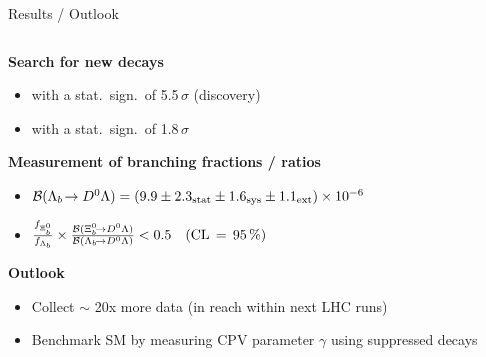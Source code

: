 \begin{frame}{Results / Outlook}
    \begin{columns}
        \begin{column}{.7\textwidth}
            \textbf{Search for new decays}
            \begin{itemize}
                \item \decay{\Lb}{\Dz\Lz} with a stat.\ sign.\ of 5.5$\,\sigma$ (discovery)
                \item \decay{\Xibz}{\Dz\Lz} with a stat.\ sign.\ of 1.8$\,\sigma$
            \end{itemize}

            \textbf{Measurement of branching fractions / ratios}
            \begin{itemize}
                \item ${\mathcal{B}}({{\Lambda}_{b}}\!\rightarrow {\ensuremath{{D}^0}}{\ensuremath{\Lambda}}) = (9.9 \pm 2.3_\text{stat} \pm 1.6_\text{sys} \pm 1.1_\text{ext}) \times 10^{-6}$
                \item $\frac{f_{{{\Xi}^0_{b}}}}{f_{{{\Lambda}_{b}}}} \times \frac{{\mathcal{B}}({{\Xi}^0_{b}}\!\rightarrow {\ensuremath{{D}^0}}{\ensuremath{\Lambda}})}{{\mathcal{B}}({{\Lambda}_{b}}\!\rightarrow {\ensuremath{{D}^0}}{\ensuremath{\Lambda}})} < 0.5 \quad (\text{CL}\,=\,95\,\%)$
            \end{itemize}
            
            \vspace{1mm}

            \textbf{Outlook}
            \begin{itemize}
                \item Collect $\sim$ 20x more data (in reach within next LHC runs)
                \item Benchmark SM by measuring CPV parameter $\gamma$ using suppressed \Dz decays
            \end{itemize}
        \end{column}
        \begin{column}{.3\textwidth}
            \centering
        \end{column}
    \end{columns}

    \vspace{5mm}

    \centering
\end{frame}
